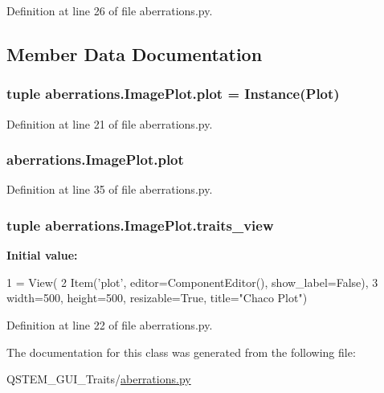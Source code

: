 Definition at line 26 of file aberrations.\-py.



\subsection{Member Data Documentation}
\hypertarget{classaberrations_1_1_image_plot_a0df77aff06cbdb95d7cc15c6e45dcb25}{
\subsubsection[{plot}]{\setlength{\rightskip}{0pt plus 5cm}tuple aberrations.\-Image\-Plot.\-plot = Instance(Plot)\hspace{0.3cm}{\ttfamily [static]}}}\label{classaberrations_1_1_image_plot_a0df77aff06cbdb95d7cc15c6e45dcb25}


Definition at line 21 of file aberrations.\-py.

\hypertarget{classaberrations_1_1_image_plot_acaa65cfa031b9a3beeb184508c9282f1}{
\subsubsection[{plot}]{\setlength{\rightskip}{0pt plus 5cm}aberrations.\-Image\-Plot.\-plot}}\label{classaberrations_1_1_image_plot_acaa65cfa031b9a3beeb184508c9282f1}


Definition at line 35 of file aberrations.\-py.

\hypertarget{classaberrations_1_1_image_plot_afc7eeed924ff5e6325fe4afc42442f5b}{
\subsubsection[{traits\-\_\-view}]{\setlength{\rightskip}{0pt plus 5cm}tuple aberrations.\-Image\-Plot.\-traits\-\_\-view\hspace{0.3cm}{\ttfamily [static]}}}\label{classaberrations_1_1_image_plot_afc7eeed924ff5e6325fe4afc42442f5b}
{\bfseries Initial value\-:}
\begin{DoxyCode}
1 = View(
2         Item(\textcolor{stringliteral}{'plot'}, editor=ComponentEditor(), show\_label=\textcolor{keyword}{False}),
3         width=500, height=500, resizable=\textcolor{keyword}{True}, title=\textcolor{stringliteral}{"Chaco Plot"})
\end{DoxyCode}


Definition at line 22 of file aberrations.\-py.



The documentation for this class was generated from the following file\-:\begin{DoxyCompactItemize}
\item 
Q\-S\-T\-E\-M\-\_\-\-G\-U\-I\-\_\-\-Traits/\hyperlink{aberrations_8py}{aberrations.\-py}\end{DoxyCompactItemize}
